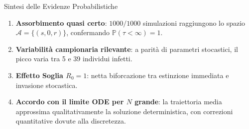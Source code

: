 \documentclass[10pt, aspectratio=169]{beamer}
\begin{document}
\begin{frame}{Sintesi delle Evidenze Probabilistiche}
    \begin{enumerate}
        \item \textbf{Assorbimento quasi certo}: $1000/1000$ simulazioni raggiungono lo spazio $\mathcal{A} = \{(s,0,r)\}$, confermando $\mathbb{P}(\tau < \infty) = 1$.
        \vspace{0.2cm}
        \item \textbf{Variabilità campionaria rilevante}: a parità di parametri stocastici, il picco varia tra 5 e 39 individui infetti.
        \vspace{0.2cm}
        \item \textbf{Effetto Soglia $R_0 = 1$}: netta biforcazione tra estinzione immediata e invasione stocastica.
        \vspace{0.2cm}
        \item \textbf{Accordo con il limite ODE per $N$ grande}: la traiettoria media approssima qualitativamente la soluzione deterministica, con correzioni quantitative dovute alla discretezza.
    \end{enumerate}

\end{frame}
\end{document}
